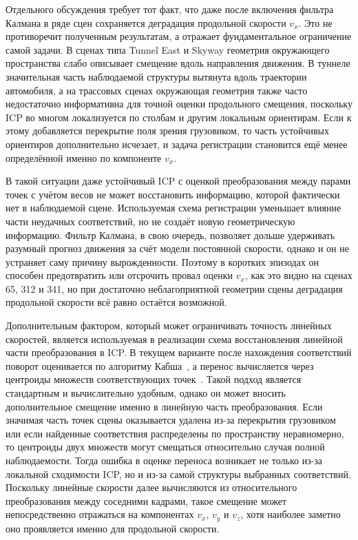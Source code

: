 Отдельного обсуждения требует тот факт, что даже после включения фильтра Калмана в ряде сцен сохраняется деградация продольной скорости \(v_x\). Это не противоречит полученным результатам, а отражает фундаментальное ограничение самой задачи. В сценах типа Tunnel East и Skyway геометрия окружающего пространства слабо описывает смещение вдоль направления движения. В туннеле значительная часть наблюдаемой структуры вытянута вдоль траектории автомобиля, а на трассовых сценах окружающая геометрия также часто недостаточно информативна для точной оценки продольного смещения, поскольку ICP во многом локализуется по столбам и другим локальным ориентирам. Если к этому добавляется перекрытие поля зрения грузовиком, то часть устойчивых ориентиров дополнительно исчезает, и задача регистрации становится ещё менее определённой именно по компоненте \(v_x\).

В такой ситуации даже устойчивый ICP с оценкой преобразования между парами точек с учётом весов не может восстановить информацию, которой фактически нет в наблюдаемой сцене. Используемая схема регистрации уменьшает влияние части неудачных соответствий, но не создаёт новую геометрическую информацию. Фильтр Калмана, в свою очередь, позволяет дольше удерживать разумный прогноз движения за счёт модели постоянной скорости, однако и он не устраняет саму причину вырожденности. Поэтому в коротких эпизодах он способен предотвратить или отсрочить провал оценки \(v_x\), как это видно на сценах 65, 312 и 341, но при достаточно неблагоприятной геометрии сцены деградация продольной скорости всё равно остаётся возможной.

Дополнительным фактором, который может ограничивать точность линейных скоростей, является используемая в реализации схема восстановления линейной части преобразования в ICP. В текущем варианте после нахождения соответствий поворот оценивается по алгоритму Кабша~\cite{kabsch-wikipedia}, а перенос вычисляется через центроиды множеств соответствующих точек~\cite{kabsch-nghiaho}. Такой подход является стандартным и вычислительно удобным, однако он может вносить дополнительное смещение именно в линейную часть преобразования. Если значимая часть точек сцены оказывается удалена из-за перекрытия грузовиком или если найденные соответствия распределены по пространству неравномерно, то центроиды двух множеств могут смещаться относительно случая полной наблюдаемости. Тогда ошибка в оценке переноса возникает не только из-за локальной сходимости ICP, но и из-за самой структуры выбранных соответствий. Поскольку линейные скорости далее вычисляются из относительного преобразования между соседними кадрами, такое смещение может непосредственно отражаться на компонентах \(v_x\), \(v_y\) и \(v_z\), хотя наиболее заметно оно проявляется именно для продольной скорости.

